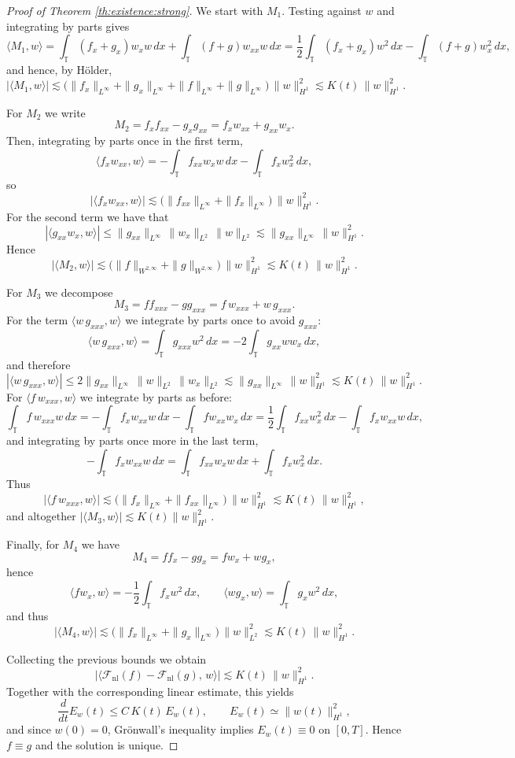 \documentclass[reqno]{amsart}
\newcommand{\TT}{\mathbb T}
\theoremstyle{definition}
\numberwithin{equation}{section}
\numberwithin{theorem}{section}
\numberwithin{definition}{section}
\begin{document}
\begin{proof}[Proof of Theorem \ref{th:existence:strong}]
\medskip
We start with $M_1$. Testing against $w$ and integrating by parts gives
\[
\langle M_1,w\rangle
=\int_\TT (f_x+g_x)w_x w\,dx+\int_\TT (f+g)w_{xx}w\,dx
=\frac12\int_\TT (f_x+g_x)w^2\,dx-\int_\TT (f+g)w_x^2\,dx,
\]
and hence, by Hölder,
\[
|\langle M_1,w\rangle|
\lesssim \big(\|f_x\|_{L^\infty}+\|g_x\|_{L^\infty}+\|f\|_{L^\infty}+\|g\|_{L^\infty}\big)\,\|w\|_{H^1}^2
\lesssim K(t)\,\|w\|_{H^1}^2.
\]

\medskip
For $M_2$ we write
\[
M_2=f_x f_{xx}-g_x g_{xx}=f_x w_{xx}+g_{xx}w_x.
\]
Then, integrating by parts once in the first term,
\[
\langle f_x w_{xx},w\rangle
=-\int_\TT f_{xx}w_x w\,dx-\int_\TT f_x w_x^2\,dx,
\]
so
\[
|\langle f_x w_{xx},w\rangle|
\lesssim \big(\|f_{xx}\|_{L^\infty}+\|f_x\|_{L^\infty}\big)\,\|w\|_{H^1}^2.
\]
For the second term we have that
\[
|\langle g_{xx}w_x,w\rangle|
\le \|g_{xx}\|_{L^\infty}\,\|w_x\|_{L^2}\,\|w\|_{L^2}
\lesssim \|g_{xx}\|_{L^\infty}\,\|w\|_{H^1}^2.
\]
Hence
\[
|\langle M_2,w\rangle|\lesssim \big(\|f\|_{W^{2,\infty}}+\|g\|_{W^{2,\infty}}\big)\,\|w\|_{H^1}^2
\lesssim K(t)\,\|w\|_{H^1}^2.
\]

\medskip
For $M_3$ we decompose
\[
M_3=f f_{xxx}-g g_{xxx}=f\,w_{xxx}+w\,g_{xxx}.
\]
For the term $\langle w\,g_{xxx},w\rangle$ we integrate by parts once to avoid $g_{xxx}$:
\[
\langle w\,g_{xxx},w\rangle=\int_\TT g_{xxx}w^2\,dx
=-2\int_\TT g_{xx} w w_x\,dx,
\]
and therefore
\[
|\langle w\,g_{xxx},w\rangle|
\le 2\|g_{xx}\|_{L^\infty}\,\|w\|_{L^2}\,\|w_x\|_{L^2}
\lesssim \|g_{xx}\|_{L^\infty}\,\|w\|_{H^1}^2
\lesssim K(t)\,\|w\|_{H^1}^2.
\]
For $\langle f\,w_{xxx},w\rangle$ we integrate by parts as before:
\[
\int_\TT f\,w_{xxx}w\,dx
=-\int_\TT f_x w_{xx}w\,dx-\int_\TT f w_{xx}w_x\,dx
=\frac12\int_\TT f_{xx}w_x^2\,dx-\int_\TT f_x w_{xx}w\,dx,
\]
and integrating by parts once more in the last term,
\[
-\int_\TT f_x w_{xx}w\,dx
=\int_\TT f_{xx}w_x w\,dx+\int_\TT f_x w_x^2\,dx.
\]
Thus
\[
|\langle f\,w_{xxx},w\rangle|
\lesssim \big(\|f_x\|_{L^\infty}+\|f_{xx}\|_{L^\infty}\big)\,\|w\|_{H^1}^2
\lesssim K(t)\,\|w\|_{H^1}^2,
\]
and altogether $|\langle M_3,w\rangle|\lesssim K(t)\|w\|_{H^1}^2$.

\medskip
Finally, for $M_4$ we have
\[
M_4=f f_x-g g_x=f w_x+w g_x,
\]
hence
\[
\langle f w_x,w\rangle=-\frac12\int_\TT f_x w^2\,dx,
\qquad
\langle w g_x,w\rangle=\int_\TT g_x w^2\,dx,
\]
and thus
\[
|\langle M_4,w\rangle|
\lesssim \big(\|f_x\|_{L^\infty}+\|g_x\|_{L^\infty}\big)\,\|w\|_{L^2}^2
\lesssim K(t)\,\|w\|_{H^1}^2.
\]

\medskip
Collecting the previous bounds we obtain
\[
\big|\langle \mathcal{F}_{\mathrm{nl}}(f)-\mathcal{F}_{\mathrm{nl}}(g),\,w\rangle\big|
\lesssim K(t)\,\|w\|_{H^1}^2.
\]
Together with the corresponding linear estimate, this yields
\[
\frac{d}{dt}E_w(t)\le C\,K(t)\,E_w(t),
\qquad E_w(t)\simeq \|w(t)\|_{H^1}^2,
\]
and since $w(0)=0$, Gr\"onwall's inequality implies $E_w(t)\equiv 0$ on $[0,T]$. Hence $f\equiv g$ and the solution is unique.


\end{proof}
\end{document}
